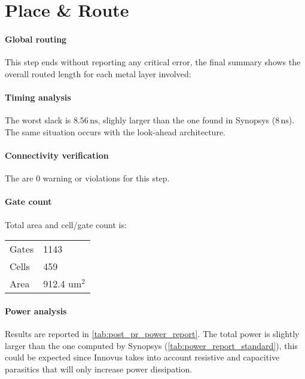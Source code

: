 \section{Place \& Route}
\paragraph{Global routing} This step ends without reporting any critical error, the final summary shows the overall routed length for each metal layer involved:


\paragraph{Timing analysis} The worst slack is $8.56\,\textrm{ns}$, slighly larger than the one found in Synopsys ($8\,\textrm{ns}$). The same situation occurs with the look-ahead architecture.


\paragraph{Connectivity verification} The are 0 warning or violations for this step.


\paragraph{Gate count} Total area and cell/gate count is:
\begin{center}
    \begin{tabular}{|l|l|}
	   \hline
	   Gates & 1143 \\
	   Cells &     459 \\
	   Area &     912.4 um$^2$\\\hline
    \end{tabular}
\end{center}


\paragraph{Power analysis} Results are reported in \autoref{tab:post_pr_power_report}. The total power is slightly larger than the one computed by Synopsys (\autoref{tab:power_report_standard}), this could be expected since Innovus takes into account resistive and capacitive parasitics that will only increase power dissipation.


